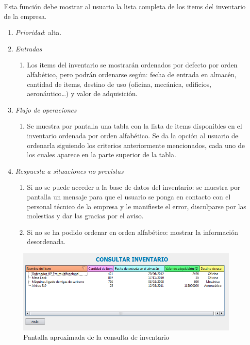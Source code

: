 	Esta función debe mostrar al usuario la lista completa de los items del inventario de la empresa.
		
	\begin{enumerate}
		\item \textit{Prioridad}: alta.
		\item \textit{Entradas}
			\begin{enumerate}
				\item Los items del inventario se mostrarán ordenados por defecto por orden alfabético, pero podrán ordenarse según: fecha de entrada en almacén, cantidad de items, destino de uso (oficina, mecánica, edificios, aeronáutico\ldots) y valor de adquisición.
			\end{enumerate}
		\item \textit{Flujo de operaciones}
			\begin{enumerate}
				\item Se muestra por pantalla una tabla con la lista de items disponibles en el inventario ordenada por orden alfabético. Se da la opción al usuario de ordenarla siguiendo los criterios anteriormente mencionados, cada uno de los cuales aparece en la parte superior de la tabla.																				\end{enumerate}
		\item \textit{Respuesta a situaciones no previstas}
			\begin{enumerate}
				\item Si no se puede acceder a la base de datos del inventario: se muestra por pantalla un mensaje para que el usuario se ponga en contacto con el personal técnico de la empresa y le manifieste el error, disculparse por las molestias y dar las gracias por el aviso.
				\item Si no se ha podido ordenar en orden alfabético: mostrar la información desordenada.
			\end{enumerate}
	\end{enumerate}
	
	\label{fun:ConsulInv}
	\begin{figure}[ht]\centering
	\includegraphics[scale=.6]{imagenes/consultarInventarioImagen.png}
	\caption{Pantalla aproximada de la consulta de inventario}
\end{figure}

								
